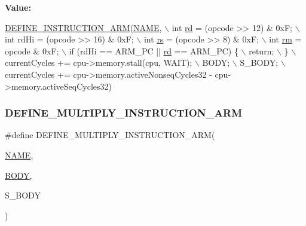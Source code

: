 {\bfseries Value\+:}
\begin{DoxyCode}
\mbox{\hyperlink{isa-arm_8c_a56ae89d1d9edfe3d78f30c0a60273883}{DEFINE\_INSTRUCTION\_ARM}}(\mbox{\hyperlink{inflate_8h_a164ea0159d5f0b5f12a646f25f99eceaa67bc2ced260a8e43805d2480a785d312}{NAME}}, \(\backslash\)
        \textcolor{keywordtype}{int} \mbox{\hyperlink{isa-arm_8c_a555541ce18ed9b5fad657a06b22cb465}{rd}} = (opcode >> 12) & 0xF; \(\backslash\)
        int rdHi = (opcode >> 16) & 0xF; \(\backslash\)
        int \mbox{\hyperlink{isa-thumb_8c_a03b78d51ad860bbea2f9c98276d0b70b}{rs}} = (opcode >> 8) & 0xF; \(\backslash\)
        int \mbox{\hyperlink{isa-thumb_8c_a20e40d2fb8c51fa4dd2b4449ad32e111}{rm}} = opcode & 0xF; \(\backslash\)
        if (rdHi == ARM\_PC || \mbox{\hyperlink{isa-arm_8c_a555541ce18ed9b5fad657a06b22cb465}{rd}} == ARM\_PC) \{ \(\backslash\)
            return; \(\backslash\)
        \} \(\backslash\)
        currentCycles += cpu->memory.stall(cpu, WAIT); \(\backslash\)
        BODY; \(\backslash\)
        S\_BODY; \(\backslash\)
        currentCycles += cpu->memory.activeNonseqCycles32 - cpu->memory.activeSeqCycles32)
\end{DoxyCode}
\mbox{\label{isa-arm_8c_ac66f9b211aee153179daa111aed4d223}} 
\subsubsection{\texorpdfstring{D\+E\+F\+I\+N\+E\+\_\+\+M\+U\+L\+T\+I\+P\+L\+Y\+\_\+\+I\+N\+S\+T\+R\+U\+C\+T\+I\+O\+N\+\_\+\+A\+RM}{DEFINE\_MULTIPLY\_INSTRUCTION\_ARM}}
{\footnotesize\ttfamily \#define D\+E\+F\+I\+N\+E\+\_\+\+M\+U\+L\+T\+I\+P\+L\+Y\+\_\+\+I\+N\+S\+T\+R\+U\+C\+T\+I\+O\+N\+\_\+\+A\+RM(\begin{DoxyParamCaption}\item[{}]{\mbox{\hyperlink{inflate_8h_a164ea0159d5f0b5f12a646f25f99eceaa67bc2ced260a8e43805d2480a785d312}{N\+A\+ME}},  }\item[{}]{\mbox{\hyperlink{gzlog_8c_aa6bdf6a6d9916c343e1e17774d84a156}{B\+O\+DY}},  }\item[{}]{S\+\_\+\+B\+O\+DY }\end{DoxyParamCaption})}

